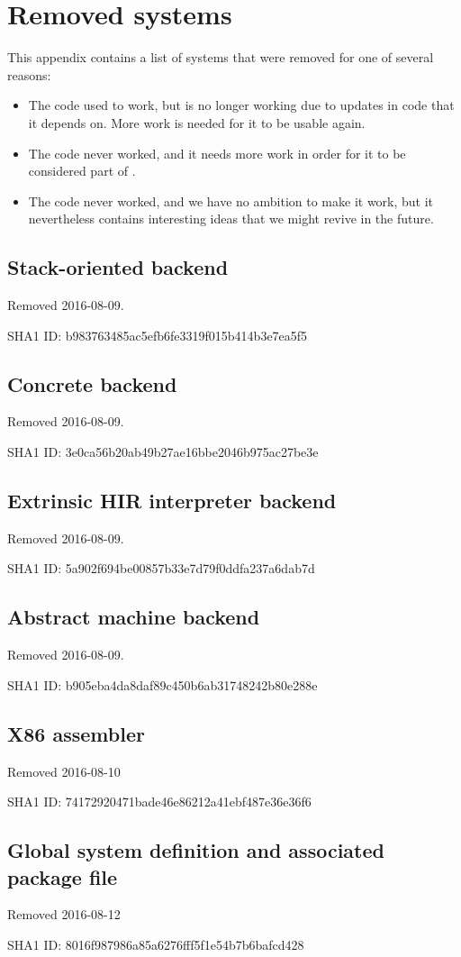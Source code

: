 \chapter{Removed systems}

This appendix contains a list of systems that were removed for one of
several reasons:

\begin{itemize}
\item The code used to work, but is no longer working due to updates
  in code that it depends on.  More work is needed for it to be usable
  again.
\item The code never worked, and it needs more work in order for it to
  be considered part of \sysname{}.
\item The code never worked, and we have no ambition to make it work,
  but it nevertheless contains interesting ideas that we might revive
  in the future.
\end{itemize}

\section{Stack-oriented \clanguage{} backend}

Removed 2016-08-09.

SHA1 ID: b983763485ac5efb6fe3319f015b414b3e7ea5f5

\section{Concrete \commonlisp{} backend}

Removed 2016-08-09.

SHA1 ID: 3e0ca56b20ab49b27ae16bbe2046b975ac27be3e

\section{Extrinsic HIR interpreter backend}

Removed 2016-08-09.

SHA1 ID: 5a902f694be00857b33e7d79f0ddfa237a6dab7d

\section{Abstract machine backend}

Removed 2016-08-09.

SHA1 ID: b905eba4da8daf89c450b6ab31748242b80e288e

\section{X86 assembler}

Removed 2016-08-10

SHA1 ID: 74172920471bade46e86212a41ebf487e36e36f6

\section{Global system definition and associated package file}

Removed 2016-08-12

SHA1 ID: 8016f987986a85a6276fff5f1e54b7b6bafcd428

